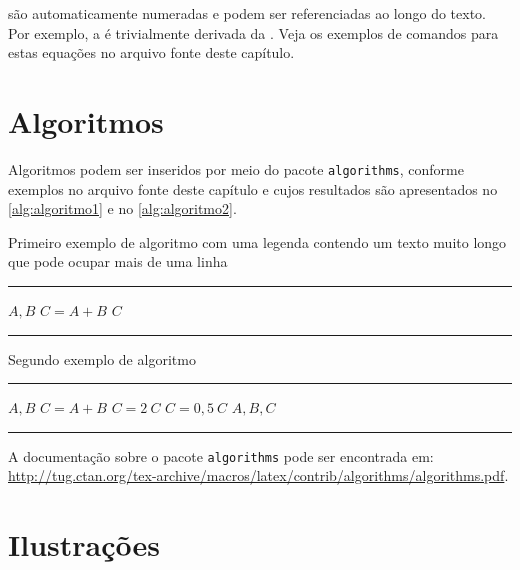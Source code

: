 \noindent são automaticamente numeradas e podem ser referenciadas ao longo do texto. Por exemplo, a  é trivialmente derivada da . Veja os exemplos de comandos para estas equações no arquivo fonte deste capítulo.

\section{Algoritmos}\label{sec:algoritmos}

Algoritmos podem ser inseridos por meio do pacote \texttt{algorithms}, conforme exemplos no arquivo fonte deste capítulo e cujos resultados são apresentados no \autoref{alg:algoritmo1} e no \autoref{alg:algoritmo2}.

\begin{algorithm}[htb]%
    \caption{Primeiro exemplo de algoritmo com uma legenda contendo um texto muito longo que pode ocupar mais de uma linha}%
    \label{alg:algoritmo1}%
    \hrule
    \begin{algorithmic}[1]%
        \ENSURE $A, B$
        \STATE $C = A + B$
        \PRINT $C$
    \end{algorithmic}
    \hrule
    \fonte{}%
\end{algorithm}

\begin{algorithm}[htb]%
    \caption{Segundo exemplo de algoritmo}%
    \label{alg:algoritmo2}%
    \hrule
    \begin{algorithmic}[1]%
        \ENSURE $A, B$
        \STATE $C = A + B$
        \STATE $C = 2 \ C$
        \ELSE
        \STATE $C = 0,5 \ C$
        \ENDIF
        \PRINT $A, B, C$
    \end{algorithmic}
    \hrule
    \fonte{}%
\end{algorithm}

A documentação sobre o pacote \texttt{algorithms} pode ser encontrada em: \url{http://tug.ctan.org/tex-archive/macros/latex/contrib/algorithms/algorithms.pdf}.

\section{Ilustrações}\label{sec:ilustracoes}

